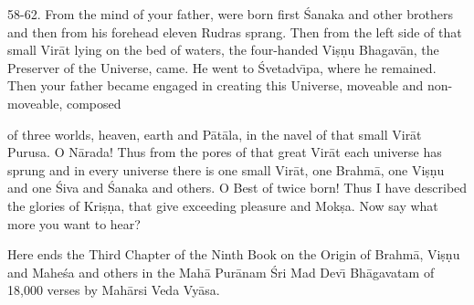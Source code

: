 58-62. From the mind of your father, were born first \'Sanaka and other brothers and then from his forehead eleven Rudras sprang. Then from the left side of that small Vir\=at lying on the bed of waters, the four-handed Vi\d{s}\d{n}u Bhagav\=an, the Preserver of the Universe, came. He went to \'Svetadv\={\i}pa, where he remained. Then your father became engaged in creating this Universe, moveable and non-moveable, composed

of three worlds, heaven, earth and P\=at\=ala, in the navel of that small Vir\=at Purusa. O N\=arada! Thus from the pores of that great Vir\=at each universe has sprung and in every universe there is one small Vir\=at, one Brahm\=a, one Vi\d{s}\d{n}u and one \'Siva and \'Sanaka and others. O Best of twice born! Thus I have described the glories of Kri\d{s}\d{n}a, that give exceeding pleasure and Mok\d{s}a. Now say what more you want to hear?

Here ends the Third Chapter of the Ninth Book on the Origin of Brahm\=a, Vi\d{s}\d{n}u and Mahe\'sa and others in the Mah\=a Pur\=anam \'Sri Mad Dev\={\i} Bh\=agavatam of 18,000 verses by Mah\=arsi Veda Vy\=asa.



